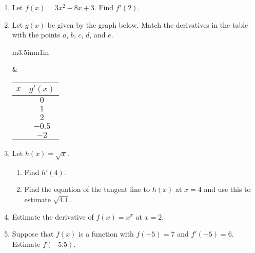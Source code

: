 \documentclass[11pt]{article}
\begin{document}
\drawtitle

\begin{enumerate}
\item Let $f(x) = 3x^2-8x+3$.  Find $f'(2)$.
  \vfill
\item Let $g(x)$ be given by the graph below.  Match the derivatives
  in the table with the points $a$, $b$, $c$, $d$, and $e$.

  \begin{center}
    \begin{tabular}{m{3.5in}m{1in}}
      \begin{tikzpicture}[scale = 1.5]
        \draw[<->] (-1,0) -- (3.75,0);
        \draw[<->] (0,-2) -- (0,3);
        \draw[-] (.27,.1) -- (.27,-.1) node[below] {$a$};
        \draw[-] (.45,.1) -- (.45,-.1) node[below] {$b$};
        \draw[-] (2,.1) -- (2,-.1) node[below] {$d$};
        \draw[-] (2.5,.1) -- (2.5,-.1) node[below] {$e$};
        \draw[-] (1,.1) -- (1,-.1) node[below] {$c$};
        
        \draw[thick, domain=-.5:3.25, <->] plot[samples=200]
        function{-x*(x-1)*(x-3)} node[right]{$g(x)$};
      \end{tikzpicture}
      &
      \begin{tabular}{c|c}
        $x$ & $g'(x)$\\
        \hline
        &$0$\\
        &$1$\\
        &$2$\\
        &$-0.5$\\
        &$-2$
      \end{tabular}
    \end{tabular}
  \end{center}

  \newpage

\item Let $h(x) = \sqrt{x}$.
  \begin{enumerate}
  \item Find $h'(4)$.
    \vfill
  \item Find the equation of the tangent line to $h(x)$ at $x=4$ and
    use this to estimate $\sqrt{4.1}$.
    \vfill
  \end{enumerate}
  
  \newpage

\item Estimate the derivative of $f(x) = x^x$ at $x=2$.

  \vfill

\item Suppose that $f(x)$ is a function with $f(-5) = 7$ and $f'(-5) =
  6$.  Estimate $f(-5.5)$.
  \vfill


\end{enumerate}
\end{document}

